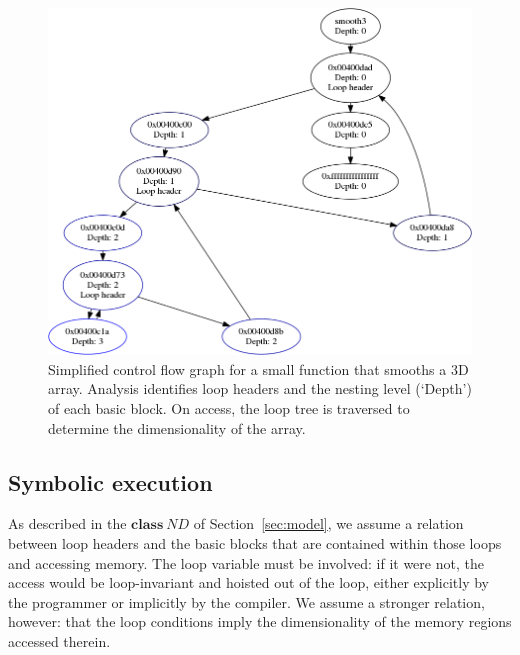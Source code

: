 \begin{figure}
  \centering
  \includegraphics[width=\linewidth]{images/dbg/s3}

  \caption{Simplified control flow graph for a small function that
  smooths a 3D array.  Analysis identifies loop headers and the nesting
  level (`Depth') of each basic block.  On access, the loop tree is
  traversed to determine the dimensionality of the array.}

  \label{fig:cfg}
\end{figure}

\subsection{Symbolic execution}

As described in the $\textbf{class} \ ND$ of Section~\ref{sec:model},
we assume a relation between loop headers and the basic blocks that are
contained within those loops and accessing memory.  The loop variable
must be involved: if it were not, the access would be loop-invariant
and hoisted out of the loop, either explicitly by the programmer or
implicitly by the compiler.  We assume a stronger relation, however:
that the loop conditions imply the dimensionality of the memory regions
accessed therein.

